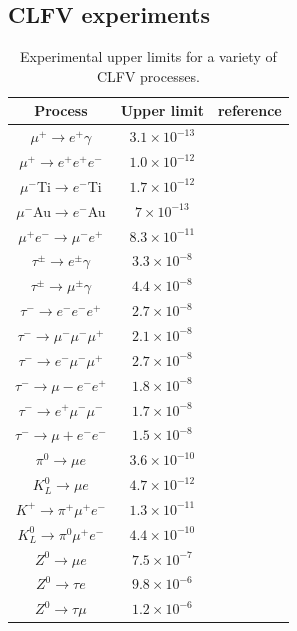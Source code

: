 \begin{refsection}
    \subsection{CLFV experiments}
        \begin{table}[!h]
            \centering
            \begin{tabular}{c|c|c}
            \hline
            Process & Upper limit & reference\\
            \hline
            \hline
            $\mu^+\rightarrow e^+\gamma$ & $3.1\times 10^{-13}$ & \cite{MEG_II:physics}\\
            $\mu^+\rightarrow e^+e^+e^-$ & $1.0\times 10^{-12}$ & \cite{SINDRUM}\\
            $\mu^-$Ti$\rightarrow e^-$Ti  & $1.7\times 10^{-12}$ & \cite{SINDRUM}\\
            $\mu^-$Au$\rightarrow e^-$Au  & $7\times 10^{-13}$   & \cite{Bertl}\\
            $\mu^+e^-\rightarrow \mu^-e^+$ & $8.3\times 10^{-11}$ & \cite{Willmann}\\
            $\tau^\pm\rightarrow e^\pm\gamma$ & $3.3\times 10^{-8}$ & \cite{Aubert}\\
            $\tau^\pm\rightarrow \mu^\pm\gamma$ & $4.4\times 10^{-8}$ & \cite{Aubert}\\
            $\tau^-\rightarrow e^-e^-e^+$ & $2.7\times 10^{-8}$ & \cite{Hayasaka}\\
            $\tau^-\rightarrow \mu^-\mu^-\mu^+$ & $2.1\times 10^{-8}$ & \cite{Hayasaka}\\
            $\tau^-\rightarrow e^-\mu^-\mu^+$ & $2.7\times 10^{-8}$ & \cite{Hayasaka}\\
            $\tau^-\rightarrow \mu-e^-e^+$ & $1.8\times 10^{-8}$ & \cite{Hayasaka}\\
            $\tau^-\rightarrow e^+\mu^-\mu^-$ & $1.7\times 10^{-8}$ & \cite{Hayasaka}\\
            $\tau^-\rightarrow \mu+e^-e^-$ & $1.5\times 10^{-8}$ & \cite{Hayasaka}\\
            $\pi^0\rightarrow \mu e$ & $3.6\times 10^{-10}$ & \cite{Abouzaid}\\
            $K^0_L\rightarrow \mu e$ & $4.7\times 10^{-12}$ & \cite{Ambrose}\\
            $K^+\rightarrow \pi^+\mu^+e^-$ & $1.3\times 10^{-11}$ & \cite{Sher}\\
            $K^0_L\rightarrow \pi^0\mu^+e^-$ & $4.4\times 10^{-10}$ & \cite{Abouzaid}\\
            $Z^0\rightarrow \mu e$ & $7.5\times10^{-7}$& \cite{Aad}\\
            $Z^0\rightarrow \tau e$ & $9.8\times10^{-6}$& \cite{Akers} \\
            $Z^0\rightarrow \tau \mu$ & $1.2\times10^{-6}$& \cite{Akers}\\
            \hline
            \end{tabular}
            \caption[Limits for CLFV processes]{Experimental upper limits for a variety of CLFV processes.}
        \label{T_CLFV}
        \end{table}
        

\end{refsection}
